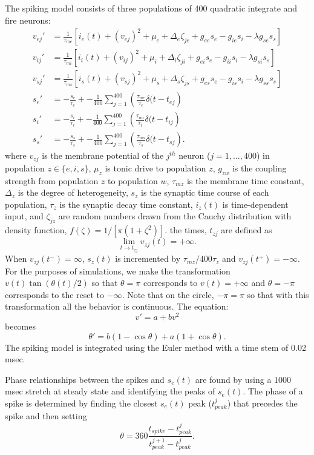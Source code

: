 \documentclass[10pt,letterpaper]{article}
\begin{document}
The spiking model consists of three populations of 400 quadratic integrate and fire neurons:
\begin{align}
  \label{eq:spike}
v_{ej}'&=\frac{1}{\tau_{me}}\left[i_e(t)+(v_{ej})^2+\mu_e+\Delta_e\zeta_{je}+g_{ee}s_e-g_{ie}s_i-\lambda g_{se}s_s\right]\\
v_{ij}'&=\frac{1}{\tau_{mi}}\left[i_i(t)+(v_{ij})^2+\mu_i+\Delta_i\zeta_{ji}+g_{ei}s_e-g_{ii}s_i-\lambda g_{si}s_s\right]\\
v_{sj}'&=\frac{1}{\tau_{ms}}\left[i_s(t)+(v_{sj})^2+\mu_s+\Delta_s\zeta_{js}+g_{es}s_e-g_{is}s_i-\lambda g_{ss}s_s\right]\\
s_e'&=-\frac{s_e}{\tau_e}+-\frac{1}{400}\sum_{j=1}^{400}\left(\frac{\tau_{me}}{\tau_e}\delta(t-t_{ej}\right)\\
s_i'&=-\frac{s_i}{\tau_i}+-\frac{1}{400}\sum_{j=1}^{400}\left(\frac{\tau_{mi}}{\tau_i}\delta(t-t_{ij}\right)\\
s_s'&=-\frac{s_s}{\tau_s}+-\frac{1}{400}\sum_{j=1}^{400}\left(\frac{\tau_{ms}}{\tau_s}\delta(t-t_{sj}\right).
\end{align}
where $v_{zj}$ is the membrane potential of the $j^{th}$ neuron ($j=1,\ldots,400$) in population $z\in\{e,i,s\}$, $\mu_z$ is tonic drive to population $z$, $g_{zw}$ is the coupling strength from population $z$ to population $w$, $\tau_{mz}$ is the membrane time constant, $\Delta_z$ is the degree of heterogeneity, $s_z$ is the synaptic time course of each population, $\tau_z$ is the synaptic decay time constant, $i_z(t)$ is time-dependent input, and $\zeta_{jz}$ are random numbers drawn from the Cauchy distribution with density function, $f(\zeta)=1/[\pi(1+\zeta^2)].$  the times, $t_{zj}$ are defined as
\[
\lim_{t\to t_{zj}}v_{zj}(t)=+\infty.
\]
When $v_{zj}(t^-)=\infty$, $s_z(t)$ is incremented by $\tau_{mz}/400\tau_z$ and $v_{zj}(t^+)=-\infty$.  
For the purposes of simulations, we make the transformation $v(t)\tan(\theta(t)/2)$ \cite{ke86} so that $\theta=\pi$ corresponds to $v(t)=+\infty$ and $\theta=-\pi$ corresponds to the reset to $-\infty$. Note that on the circle, $-\pi=\pi$ so that with this transformation all the behavior is continuous.  The equation:
\[
v'=a + b v^2
\]
becomes
\[
\theta' = b(1-\cos\theta)+a(1+\cos\theta).
\]
The spiking model is integrated using the Euler method with a time stem of 0.02 msec.

Phase relationships between the spikes and $s_e(t)$ are found by using a 1000 msec stretch at steady state and identifying the peaks of $s_e(t)$.  The phase of a spike is determined by finding the closest $s_e(t)$ peak ($t_{peak}^j$) that precedes the spike and then setting
\[
\theta=360 \frac{t_{spike}-t_{peak}^j}{t_{peak}^{j+1}-t_{peak}^j}.
\]
\end{document}
